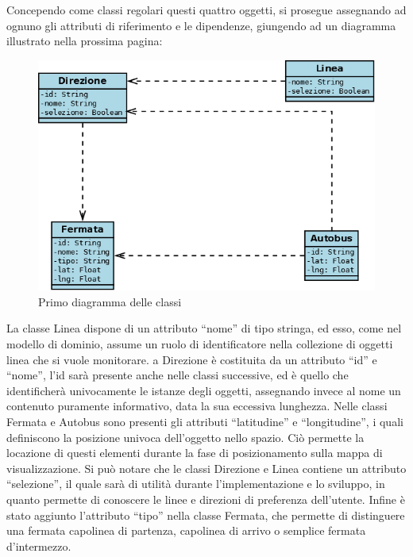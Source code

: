 Concependo come classi regolari questi quattro oggetti, si prosegue assegnando ad ognuno gli attributi di riferimento e le dipendenze, giungendo ad un diagramma illustrato nella prossima pagina:
\newpage
\vspace{1cm}
\begin{figure}[htbp]
\begin{center}
\includegraphics{contents/images/dcd1}
\end{center}
\caption{Primo diagramma delle classi}
\label{fig:dcd}
\end{figure}
\vspace{1cm}
La classe Linea dispone di un attributo ``nome'' di tipo stringa, ed esso, come nel modello di dominio, assume un ruolo di identificatore nella collezione di oggetti linea che si vuole monitorare.
a Direzione è costituita da un attributo ``id'' e ``nome'', l'id sarà presente anche nelle classi successive, ed è quello che identificherà univocamente le istanze degli oggetti, assegnando invece al nome un contenuto puramente informativo, data la sua eccessiva lunghezza.
Nelle classi Fermata e Autobus sono presenti gli attributi ``latitudine'' e ``longitudine'', i quali definiscono la posizione univoca dell'oggetto nello spazio. Ciò permette la locazione di questi elementi durante la fase di posizionamento sulla mappa di visualizzazione.
Si può notare che le classi Direzione e Linea contiene un attributo ``selezione'', il quale sarà di utilità durante l'implementazione e lo sviluppo, in quanto permette di conoscere le linee e direzioni di preferenza dell'utente.
Infine è stato aggiunto l'attributo ``tipo'' nella classe Fermata, che permette di distinguere una fermata capolinea di partenza, capolinea di arrivo o semplice fermata d'intermezzo.

